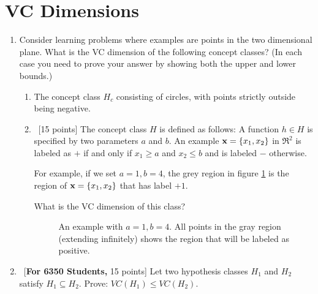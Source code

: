 \section{VC Dimensions}
\label{sec:vc}

\begin{enumerate}
\item Consider learning problems where examples are points in the two
  dimensional plane. What is the VC dimension of the following concept
  classes? (In each case you need to prove your answer by showing both
  the upper and lower bounds.)

  \begin{enumerate}
    
  \item \relax[15 points] The concept class $H_c$ consisting of
    circles, with points strictly outside being negative.


  \item ~[15 points] The concept class $H$ is defined as follows: A
    function $h \in H$ is specified by two parameters $a$ and
    $b$. An example ${\bf x} = \{x_1, x_2\}$ in $\Re^2$ is labeled
    as $+$ if and only if $x_1 \geq a$ and $x_2 \leq b$ and is
    labeled $-$ otherwise.

    For example, if we set $a = 1, b = 4$, the grey region in figure
    \ref{f1} is the region of ${\bf x} = \{x_1, x_2\}$ that has label
    $+1$. 

    What is the VC dimension of this class?

    \begin{figure}[h]
      \centering
      \caption{An example with $a = 1, b = 4$. All points in the gray region
        (extending infinitely) shows the region that will be labeled as
        positive.} \label{f1}
    \end{figure}

  \end{enumerate}



\item ~[{\bf For 6350 Students,} 15 points] Let two hypothesis classes
  $H_1$ and $H_2$ satisfy $H_1 \subseteq H_2$. Prove: $VC(H_1) \leq
  VC(H_2)$.
  
\end{enumerate}

